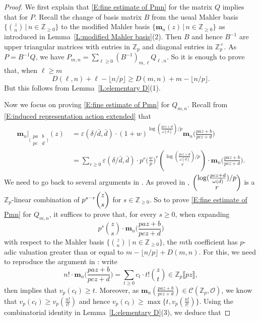 \documentclass[12pt]{amsart}
\theoremstyle{definition}
\numberwithin{equation}{subsection}
\def\calC{\mathcal{C}}
\def\calO{\mathcal{O}}
\def\ZZ{\mathbb{Z}}
\def\bfm{\mathbf{m}}
\newcommand{\Matrix}[4]{{\big(\begin{smallmatrix}#1&#2\\#3& #4\end{smallmatrix} \big)}}
\begin{document}
\begin{proof}
We first explain that \eqref{E:fine estimate of Pmn} for the matrix $Q$ implies that for $P$. 
Recall the change of basis matrix $B$ from the usual Mahler basis $\{\binom zn\,|\, n \in \ZZ_{\geq 0}\}$ to the modified Mahler basis $\{\bfm_n(z)\,|\, n\in \ZZ_{\geq 0}\}$ as introduced in Lemma~\ref{L:modified Mahler basis}(2). Then $B$ and hence $B^{-1}$ are upper triangular matrices with entries in $\ZZ_p$ and diagonal entries in $\ZZ_p^\times$.
As $P = B^{-1}Q$, we have
$
P_{m,n} = \sum\limits_{\ell \geq 0} (B^{-1})_{m,\ell} Q_{\ell, n}.
$
So it is enough to prove that, when $\ell \geq m$
$$
D(\ell, n) + \ell -\lfloor n/p\rfloor \geq D(m,n) + m -\lfloor n/p\rfloor.
$$
But this follows from Lemma~\ref{L:elementary D}(1).

Now we focus on proving \eqref{E:fine estimate of Pmn} for $Q_{m,n}$.
Recall from \eqref{E:induced representation action extended} that
\begin{align}
\label{E:m slash abcd}
\bfm_n\big|_{\Matrix{pa}b{pc}d}(z)\ & = \varepsilon(\delta /\bar  d, \bar d) \cdot (1+w)^{\log(\frac{pcz+d}{\omega(\bar d)}) / p} \bfm_n\Big( \frac{paz+b}{pcz+d}\Big)
\\
\nonumber
& = \sum_{r \geq 0}\varepsilon(\delta /\bar  d, \bar d) \cdot p^r \Big(\frac wp\Big)^r \binom{\log(\frac{pcz+d}{\omega(\bar d)})/ p}{r} \cdot  \bfm_n\Big( \frac{paz+b}{pcz+d}\Big).
\end{align}
We need to go back to several arguments in \cite[\S\,3]{liu-wan-xiao}. As proved in \cite[Lemma~3.13]{liu-wan-xiao},  $\dbinom{\log(\frac{pcz+d}{\omega(\bar d)}) / p}{r}$ is a $\ZZ_p$-linear combination of $p^{s-r} \dbinom zs$ for $s \in \ZZ_{\geq 0}$. So to prove \eqref{E:fine estimate of Pmn} for $Q_{m,n}$, it suffices to prove that, for every $s\geq 0$, when expanding
$$p^s\binom zs \cdot \bfm_n\Big( \frac{paz+b}{pcz+d}\Big)$$ 
with respect to the Mahler basis $\{\binom zn\;|\; n \in \ZZ_{\geq 0}\}$, the $m$th coefficient has $p$-adic valuation greater than or equal to $m-\lfloor n/ p\rfloor + D(m,n)$. For this, we need to reproduce the argument in \cite[Lemma~3.12]{liu-wan-xiao}: write 
$$
n!\cdot \bfm_n\Big( \frac{paz+b}{pcz+d}\Big) = \sum_{t \geq 0} c_t \cdot t! \binom zt \in \ZZ_p\llbracket pz\rrbracket,
$$
then \cite[Lemma~3.11]{liu-wan-xiao} implies that $v_p(c_t) \geq t$.  Moreover, as $\bfm_n(\frac{paz+b}{pcz+d}) 
\in
\calC(\ZZ_p, \calO)$, we know that $v_p(c_t)\geq v_p(\frac{n!}{t!})$ and hence $v_p(c_t)\geq \max\{t,v_p(\frac{n!}{t!})\}$.
Using the combinatorial identity in Lemma~\ref{L:elementary D}(3), we deduce that 

\end{proof}
\end{document}
